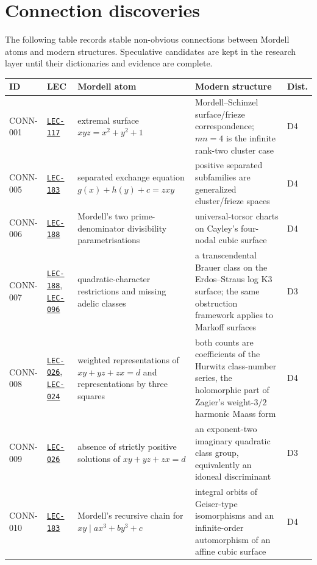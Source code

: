 \section*{Connection discoveries}

The following table records stable non-obvious connections between Mordell
atoms and modern structures. Speculative candidates are kept in the research
layer until their dictionaries and evidence are complete.

\providecommand{\ConnectionLECLink}[1]{\hyperlink{eq:#1}{\texttt{#1}}}

\begingroup
\footnotesize
\renewcommand{\arraystretch}{1.08}
\setlength{\tabcolsep}{4pt}

\begin{center}
\begin{tabular}{@{}p{}p{}p{}p{}p{}@{}}
\toprule
ID & LEC & Mordell atom & Modern structure & Dist. \\
\midrule
CONN-001
& \ConnectionLECLink{LEC-117}
& extremal surface \(xyz=x^2+y^2+1\)
& Mordell--Schinzel surface/frieze correspondence; \(mn=4\) is the infinite rank-two cluster case \cite{dsg-zhang-ms-surfaces,fomin-zelevinsky-cluster-ii}
& D4 \\
CONN-005
& \ConnectionLECLink{LEC-183}
& separated exchange equation \(g(x)+h(y)+c=zxy\)
& positive separated subfamilies are generalized cluster/frieze spaces \cite{dsg-zhang-ms-surfaces}
& D4 \\
CONN-006
& \ConnectionLECLink{LEC-188}
& Mordell's two prime-denominator divisibility parametrisations
& universal-torsor charts on Cayley's four-nodal cubic surface \cite{elsholtz-tao-erdos-straus,heath-brown-cayley-cubic}
& D4 \\
CONN-007
& \ConnectionLECLink{LEC-188}, \ConnectionLECLink{LEC-096}
& quadratic-character restrictions and missing adelic classes
& a transcendental Brauer class on the Erdos--Straus log K3 surface; the same obstruction framework applies to Markoff surfaces \cite{bright-loughran-erdos-straus,ctwx-markoff-brauer}
& D3 \\
CONN-008
& \ConnectionLECLink{LEC-026}, \ConnectionLECLink{LEC-024}
& weighted representations of \(xy+yz+zx=d\) and representations by three squares
& both counts are coefficients of the Hurwitz class-number series, the holomorphic part of Zagier's weight-\(3/2\) harmonic Maass form \cite{zagier-class-numbers,bhand-singh-zagier}
& D4 \\
CONN-009
& \ConnectionLECLink{LEC-026}
& absence of strictly positive solutions of \(xy+yz+zx=d\)
& an exponent-two imaginary quadratic class group, equivalently an idoneal discriminant \cite{louboutin-newman-xyz,kani-idoneal}
& D3 \\
CONN-010
& \ConnectionLECLink{LEC-183}
& Mordell's recursive chain for \(xy\mid ax^3+by^3+c\)
& integral orbits of Geiser-type isomorphisms and an infinite-order automorphism of an affine cubic surface \cite{schinzel-congruence,kollar-vp-cubic,kollar-li-ms}
& D4 \\
\bottomrule
\end{tabular}
\end{center}

\endgroup
